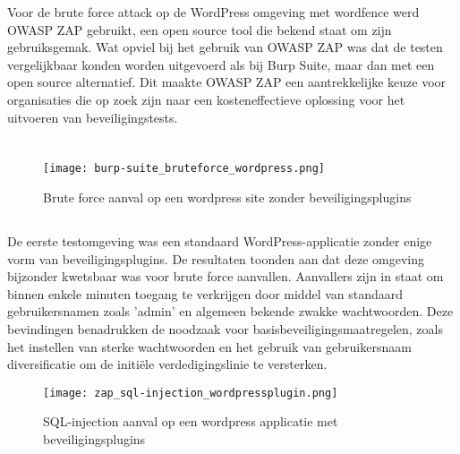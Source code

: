 Voor de brute force attack op de WordPress omgeving met wordfence werd OWASP ZAP gebruikt, een open source tool die bekend staat om zijn gebruiksgemak. 
Wat opviel bij het gebruik van OWASP ZAP was dat de testen vergelijkbaar konden worden uitgevoerd als bij Burp Suite, maar dan met een open source alternatief. 
Dit maakte OWASP ZAP een aantrekkelijke keuze voor organisaties die op zoek zijn naar een kosteneffectieve oplossing voor het uitvoeren van beveiligingstests.


\section{}
\begin{figure}
    \centering
    \texttt{[image: burp-suite\_bruteforce\_wordpress.png]}
    \caption[Brute force aanval op een wordpress applicatie zonder beveiligingsplugins]{Brute force aanval op een wordpress site zonder beveiligingsplugins}
\end{figure}
\subsection{}
De eerste testomgeving was een standaard WordPress-applicatie zonder enige vorm van beveiligingsplugins. De resultaten toonden aan dat deze 
omgeving bijzonder kwetsbaar was voor brute force aanvallen. Aanvallers zijn in staat om binnen enkele minuten toegang te verkrijgen door middel 
van standaard gebruikersnamen zoals 'admin' en algemeen bekende zwakke wachtwoorden. Deze bevindingen benadrukken de noodzaak voor 
basisbeveiligingsmaatregelen, zoals het instellen van sterke wachtwoorden en het gebruik van gebruikersnaam diversificatie om de initiële 
verdedigingslinie te versterken.

\begin{figure}
    \centering
    \texttt{[image: zap\_sql-injection\_wordpressplugin.png]}
    \caption[SQL-injection aanval op een wordpress applicatie met beveiligingsplugins]{SQL-injection aanval op een wordpress applicatie met beveiligingsplugins}
\end{figure}
